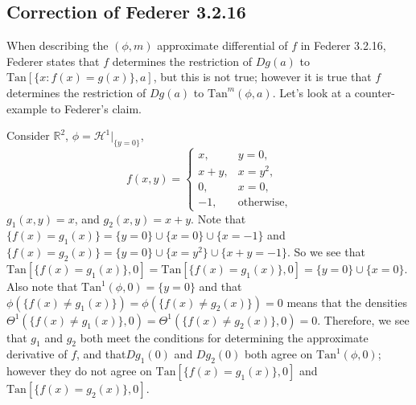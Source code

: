 \subsection{Correction of Federer 3.2.16}

When describing the \((\phi, m)\) approximate differential of \(f\) in Federer 3.2.16, Federer states that \(f\) determines the restriction of \(Dg(a)\) to \(\text{Tan}[\{x : f(x) = g(x)\}, a]\),
but this is not true; however it is true that \(f\) determines the restriction of \(Dg(a)\) to \(\text{Tan}^m(\phi, a)\). Let's look at a counter-example to Federer's claim.

Consider \(\mathbb R^2\), \(\phi = \mathcal H ^1 |_{\{y = 0\}} \), 
\begin{equation}
f(x, y) = \begin{cases}
    x, & y = 0, \\
    x + y, & x = y^2, \\
    0, & x= 0, \\
    -1, & \text{otherwise},
\end{cases}
\end{equation}
\(g_1(x, y) = x\), and \(g_2(x, y) = x + y\). Note that \(\{f(x) = g_1(x) \} = \{y = 0 \} \cup \{x = 0\} \cup \{x = -1\}\) and \(\{f(x) = g_2(x)\} = \{y= 0\} \cup \{x= y^2\} \cup \{x + y = -1\}\).
So we see that \(\text{Tan}[\{f(x) = g_1(x)\}, 0] = \text{Tan}[\{f(x) = g_1(x)\}, 0] = \{y = 0\} \cup \{x = 0\}\). Also note that
\(\text{Tan}^1 (\phi, 0) = \{y = 0\}\) and that \(\phi\left(\{f(x) \neq g_1(x)\}\right) = \phi\left(\{f(x) \neq g_2(x)\}\right) = 0\) means that the densities
\(\Theta^1(\{f(x) \neq g_1(x)\}, 0) = \Theta^1(\{f(x) \neq g_2(x)\}, 0) = 0\).
Therefore, we see that \(g_1\) and \(g_2\) both meet the conditions for determining the approximate derivative of \(f\), and that\(Dg_1(0)\) and \(Dg_2(0)\) both agree on \(\text{Tan}^1 (\phi, 0)\);
however they do not agree on \(\text{Tan}[\{f(x) = g_1(x)\}, 0]\) and \(\text{Tan}[\{f(x) = g_2(x)\}, 0]\).

